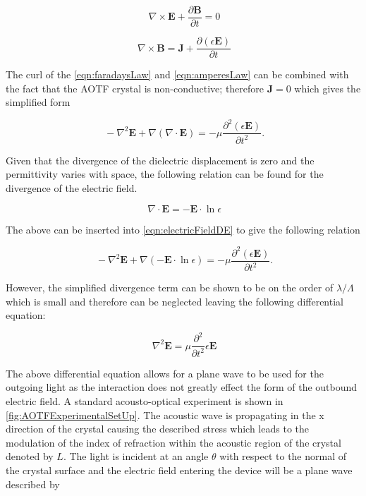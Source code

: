 \begin{equation}
    \ \nabla \times \mathbf{E} + \frac{\partial \mathbf{B}}{\partial t} = 0
    \label{eqn:faradaysLaw}
\end{equation}

\begin{equation}
    \ \nabla \times \mathbf{B} = \mathbf{J} + \frac{\partial(\epsilon \mathbf{E})}{\partial t}
    \label{eqn:amperesLaw}
\end{equation}

The curl of the \autoref{eqn:faradaysLaw} and \autoref{eqn:amperesLaw} can be combined with the fact that the AOTF crystal is non-conductive; therefore $\mathbf{J} = 0$ which gives the simplified form

\begin{equation}
    \ -\nabla^{2} \mathbf{E} + \nabla (\nabla \cdot \mathbf{E}) = -\mu \frac{\partial^{2} (\epsilon \mathbf{E})}{\partial t^{2}}.
    \label{eqn:electricFieldDE}
\end{equation}

Given that the divergence of the dielectric displacement is zero and the permittivity varies with space, the following relation can be found for the divergence of the electric field.

\begin{equation}
    \ \nabla \cdot \mathbf{E} = -\mathbf{E} \cdot \ln{\epsilon}
    \label{eqn:divergenceEField}
\end{equation}

The above can be inserted into \autoref{eqn:electricFieldDE} to give the following relation

\begin{equation}
    \ -\nabla^{2} \mathbf{E} + \nabla (-\mathbf{E} \cdot \ln{\epsilon}) = -\mu \frac{\partial^{2} (\epsilon \mathbf{E})}{\partial t^{2}}.
    \label{eqn:electricFieldDEAcousticWave}
\end{equation}

However, the simplified divergence term can be shown to be on the order of $\lambda /\Lambda$ which is small and therefore can be neglected leaving the following differential equation:

\begin{equation}
    \ \nabla^{2} \mathbf{E} = \mu \frac{\partial^{2}}{\partial t^{2}}\epsilon \mathbf{E}
    \label{eqn:eletricFieldAcoustoWave}
\end{equation}

The above differential equation allows for a plane wave to be used for the outgoing light as the interaction does not greatly effect the form of the outbound electric field. A standard acousto-optical experiment is shown in \autoref{fig:AOTFExperimentalSetUp}. The acoustic wave is propagating in the x direction of the crystal causing the described stress which leads to the modulation of the index of refraction within the acoustic region of the crystal denoted by $L$. The light is incident at an angle $\theta$ with respect to the normal of the crystal surface and the electric field entering the device will be a plane wave described by

